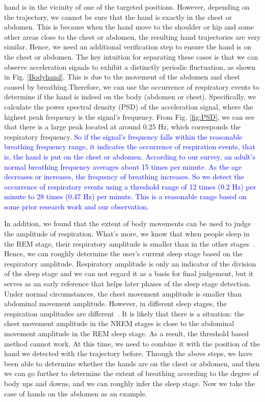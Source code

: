 hand is in the vicinity of one of the targeted positions. However, depending on the trajectory, we cannot be sure that the hand is exactly
in the chest or abdomen. This is because when the hand move to the shoulder or hip and some other areas close to the chest or abdomen, the
resulting hand trajectories are very similar. Hence, we need an additional verification step to ensure the hand is on the chest or abdomen.
The key intuition for separating these cases is that we can observe acceleration signals to exhibit a distinctly periodic fluctuation, as
shown in Fig. \ref{Bodyhand}. This is due to the movement of the abdomen and chest caused by breathing.Therefore, we can use the occurrence
of respiratory events to determine if the hand is indeed on the body (abdomen or chest).
 Specifically, we calculate the power spectral density (PSD) of the acceleration signal, where the highest peak frequency is the signal's frequency. From Fig. \ref{fig:PSD}, we can see that there is a large peak located at around 0.25 Hz, which corresponds the respiratory frequency. \textcolor{blue}{So if the signal's frequency falls within the reasonable breathing frequency range, it indicates the occurrence of respiration events, that is, the hand is put on the chest or abdomen. According to our survey\cite{Breath_frequence}, an adult's normal breathing frequency averages about 15 times per minute. As the age decreases or increases, the frequency of breathing increases. So we detect the occurrence of respiratory events using a threshold range of 12 times (0.2 Hz) per minute to 28 times (0.47 Hz) per minute. This is a reasonable range based on some prior research work and our observation. }

In addition, we found that the extent of body movements can be used to judge the amplitude of respiration. What's more, we know that when people sleep in the REM stage, their respiratory amplitude is smaller than in the other stages~\cite{respiratory1982}. Hence, we can roughly determine the user's current sleep stage based on the respiratory amplitude. Respiratory amplitude is only an indicator of the division of the sleep stage and we can not regard it as a basis for final judgement, but it serves as an early reference that helps later phases of the sleep stage detection. Under normal circumstances, the chest movement amplitude is smaller than abdominal movement amplitude. However, in different sleep stages, the respiration amplitudes are different~\cite{respiratory}. It is likely that there is a situation: the chest movement amplitude in the NREM stages is close to the abdominal movement amplitude in the REM sleep stage. As a result, the threshold based method cannot work. At this time, we need to combine it with the position of the hand we detected with the trajectory before. Through the above steps, we have been able to determine whether the hands are on the chest or abdomen, and then we can go further to determine the extent of breathing according to the degree of body ups and downs, and we can roughly infer the sleep stage. Now we take the case of hands on the abdomen as an example.



